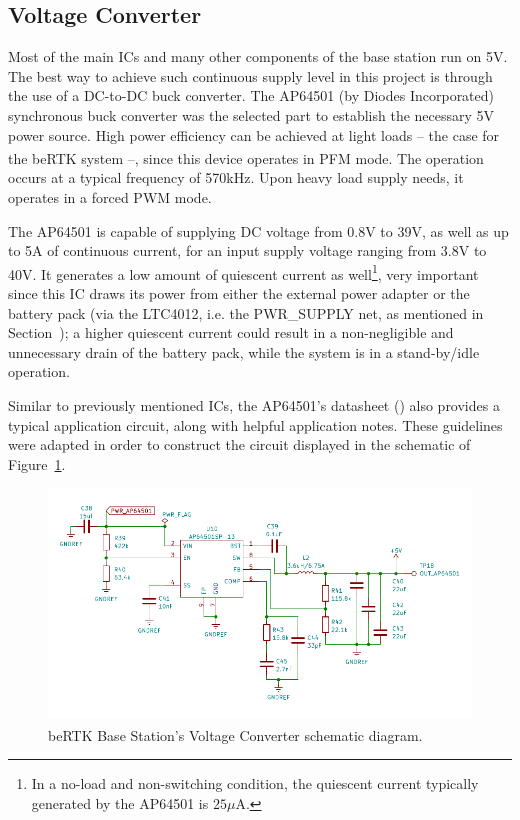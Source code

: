 

\subsection{Voltage Converter}\label{sec:3214_AP64501}

Most of the main ICs and many other components of the base station run on 5V. The best way to achieve such continuous supply level in this project is through the use of a DC-to-DC buck converter. The AP64501 (by Diodes Incorporated) synchronous buck converter was the selected part to establish the necessary 5V power source. High power efficiency can be achieved at light loads -- the case for the beRTK\textsuperscript{\textregistered} system --, since this device operates in \gls{PFM} mode. The operation occurs at a typical frequency of 570kHz. Upon heavy load supply needs, it operates in a forced PWM mode.

The AP64501 is capable of supplying DC voltage from 0.8V to 39V, as well as up to 5A of continuous current, for an input supply voltage ranging from 3.8V to 40V. It generates a low amount of quiescent current as well\footnote[11]{In a no-load and non-switching condition, the quiescent current typically generated by the AP64501 is $25 \mu$A.}, very important since this IC draws its power from either the external power adapter or the battery pack (via the LTC4012, i.e. the PWR\_SUPPLY net, as mentioned in Section~\cite{sec:3213_SWITCH}); a higher quiescent current could result in a non-negligible and unnecessary drain of the battery pack, while the system is in a stand-by/idle operation.

Similar to previously mentioned ICs, the AP64501's datasheet (\cite{AP64501}) also provides a typical application circuit, along with helpful application notes. These guidelines were adapted in order to construct the circuit displayed in the schematic of Figure~\ref{fig:AP64501_circuit}.

\begin{figure}[h]
	\centering
	\includegraphics[width=1.0\textwidth]{Chapters/Figures/chapter3/Voltage_Converter.pdf}
	\caption{beRTK\textsuperscript{\textregistered} Base Station's Voltage Converter schematic diagram.}
	\label{fig:AP64501_circuit}
\end{figure}

